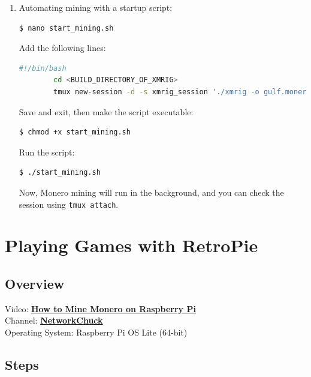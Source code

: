 \documentclass[a4paper,12pt]{article}
\begin{document}
\begin{enumerate}
\begin{enumerate}
        \item Automating mining with a startup script:
        \begin{lstlisting}[language=bash, breaklines=true, breakatwhitespace=true, columns=fullflexible]
        $ nano start_mining.sh
        \end{lstlisting}
        Add the following lines:
        \begin{lstlisting}[language=bash, breaklines=true, breakatwhitespace=true, columns=fullflexible]
        #!/bin/bash
        cd <BUILD_DIRECTORY_OF_XMRIG>
        tmux new-session -d -s xmrig_session './xmrig -o gulf.moneroocean.stream:10128 -u <YOUR_WALLET_ADDRESS> -p <WORKER_NAME>'
        \end{lstlisting}
        Save and exit, then make the script executable:
        \begin{lstlisting}[language=bash, breaklines=true, breakatwhitespace=true, columns=fullflexible]
        $ chmod +x start_mining.sh
        \end{lstlisting}
        Run the script:
        \begin{lstlisting}[language=bash, breaklines=true, breakatwhitespace=true, columns=fullflexible]
        $ ./start_mining.sh
        \end{lstlisting}
	Now, Monero mining will run in the background, and you can check the session using \texttt{tmux attach}.
    \end{enumerate}
\end{enumerate}

\section{Playing Games with RetroPie}

\subsection{Overview}
Video: \href{https://www.youtube.com/watch?v=AaseHnf0k2o}{\textbf{\color{blue}How to Mine Monero on Raspberry Pi}} \\
Channel: \href{https://www.youtube.com/@NetworkChuck}{\textbf{\color{blue}NetworkChuck}} \\
Operating System: Raspberry Pi OS Lite (64-bit)

\subsection{Steps}
\end{document}
